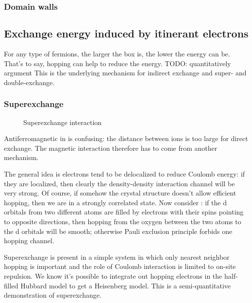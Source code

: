 \documentclass[hyperref, a4paper]{article}
\begin{document}
\subsubsection{Domain walls}



\subsection{Exchange energy induced by itinerant electrons}

For any type of fermions, 
the larger the box is, 
the lower the energy can be.
That's to say, 
hopping can help to reduce the energy. TODO: quantitatively argument
This is the underlying mechanism for indirect exchange and 
super- and double-exchange.

\subsubsection{Superexchange}

\begin{figure}
    \centering
    
    \caption{Superexchange interaction}
    \label{fig:superexchange}
\end{figure}

Antiferromagnetic in  is confusing: 
the distance between  ions is too large for direct exchange.
The magnetic interaction therefore has to come from another mechanism.

The general idea is electrons tend to be delocalized to reduce Coulomb energy:
if they are localized, 
then clearly the density-density interaction channel will be very strong.
Of course, if somehow the crystal structure doesn't allow efficient hopping, 
then we are in a strongly correlated state. 
Now consider :
if the d orbitals from two different  atoms are filled by 
electrons with their spins pointing to opposite directions, 
then hopping from the oxygen between the two  atoms to the d orbitals
will be smooth; 
otherwise Pauli exclusion principle forbids one hopping channel. 

Superexchange is present in a simple system 
in which only nearest neighbor hopping is important 
and the role of Coulomb interaction 
is limited to on-site repulsion.
We know it's possible to integrate out hopping electrons in the half-filled Hubbard model 
to get a Heisenberg model.
This is a semi-quantitative demonstration of superexchange.
\end{document}
